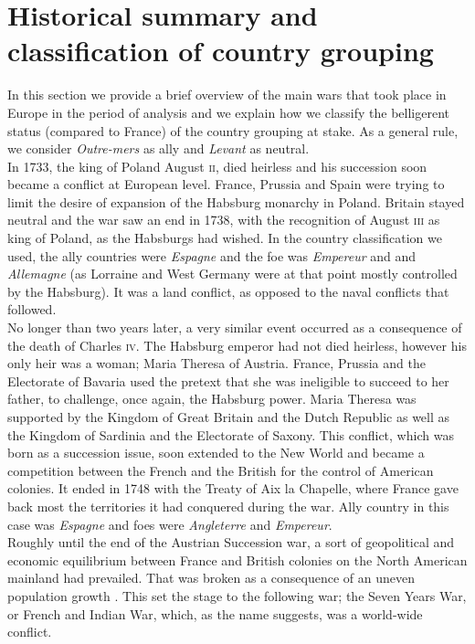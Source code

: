\documentclass[12pt,a4paper,notitlepage,english]{article}
\begin{document}
\section{Historical summary and classification of country grouping} \label{app:historical_summary}
In this section we provide a brief overview of the main wars that took place in Europe in the period of analysis and we explain how we classify the belligerent status (compared to France) of the country grouping at stake. As a general rule, we consider \textit{Outre-mers} as ally and \textit{Levant} as neutral. \\
In 1733, the king of Poland August \textsc{ii}, died heirless and his succession soon became a conflict at European level.
France, Prussia and Spain were trying to limit the desire of expansion of the Habsburg monarchy in Poland. Britain stayed neutral and the war saw an end in 1738, with the recognition of August \textsc{iii} as king of Poland, as the Habsburgs had wished.
In the country classification we used, the ally countries were \textit{Espagne}  and the foe was \textit{Empereur} and and \textit{Allemagne} (as Lorraine and West Germany were at that point mostly controlled by the Habsburg).
It was a land conflict, as opposed to the naval conflicts that followed. \\
No longer than two years later, a very similar event occurred as a consequence of the death of Charles \textsc{iv}.
The Habsburg emperor had not died heirless, however his only heir was a woman; Maria Theresa of Austria.
France, Prussia and the Electorate of Bavaria used the pretext that she was ineligible to succeed to her father, to challenge, once again, the Habsburg power.
Maria Theresa was supported by the Kingdom of Great Britain and the Dutch Republic as well as the Kingdom of Sardinia and the Electorate of Saxony.
This conflict, which was born as a succession issue, soon extended to the New World and became a competition between the French and the British for the control of American colonies.
It ended in 1748 with the Treaty of Aix la Chapelle, where France gave back most the territories it had conquered during the war.
Ally country in this case was \textit{Espagne} and foes were \textit{Angleterre} and \textit{Empereur}. \\
Roughly until the end of the Austrian Succession war, a sort of geopolitical and economic equilibrium between France and British colonies on the North American mainland had prevailed. That was broken as a consequence of an uneven population growth \citep{Findlay2009}.
This set the stage to the following war; the Seven Years War, or French and Indian War, which, as the name suggests, was a world-wide conflict.
\end{document}
